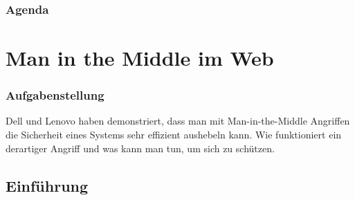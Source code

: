 \documentclass{beamer}
\begin{document}
	\begin{frame} %
		\frametitle{Agenda}
		\tableofcontents
	\end{frame}
	
	\section{Man in the Middle im Web}
	
		\begin{frame}
			\frametitle{Aufgabenstellung}
			Dell und Lenovo haben demonstriert, dass man mit Man-in-the-Middle
			Angriffen die Sicherheit eines Systems sehr effizient aushebeln kann.
			Wie funktioniert ein derartiger Angriff und was kann man tun, um sich
			zu schützen.
	    \end{frame}
	     \subsection*{Einführung}
\end{document}
